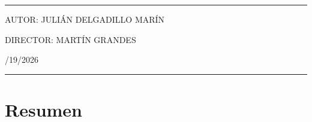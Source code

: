 \documentclass[12pt,a4paper]{report}
\newcommand{\thesisbodyformat}{%
	\onehalfspacing
	\justifying
	\setlength{\parindent}{0pt}
	\setlength{\parskip}{0.8em}
}
\newcommand{\ShelfRule}{%
	\vspace{-0.15cm}
	\par\noindent
	\textcolor{lineblue}{\rule{\linewidth}{0.6pt}}%
}
\begin{document}
\begin{titlepage}
		\ShelfRule
		\vspace{1.8cm}

		\begin{center}
			\begin{minipage}{0.9\textwidth}
				\raggedright
				{\timesfont\fontsize{14}{17}\selectfont
					\MakeUppercase{Autor: Julián Delgadillo Marín}}

				\vspace{0.25cm}

				{\timesfont\fontsize{14}{17}\selectfont
					\MakeUppercase{Director: Martín Grandes}}
			\end{minipage}
		\end{center}

		\vfill

	\begin{center}
		{\cambriafont\fontsize{12}{14}/19/2026}
	\end{center}
		\ShelfRule

	\end{titlepage}

	\thesisbodyformat


	\chapter*{Resumen}
	\label{chap:resumen}
\end{document}
